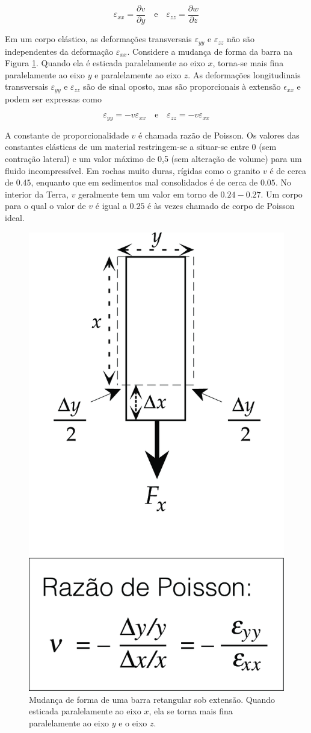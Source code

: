 \documentclass[]{book}
\theoremstyle{definition}
\theoremstyle{definition}
\theoremstyle{definition}
\theoremstyle{remark}
\begin{document}
\begin{equation}
\varepsilon_{xx}= \frac{\partial{v}}{\partial y} \quad \text{e} \quad \varepsilon_{zz}= \frac{\partial{w}}{\partial z}  \label{eq:0305}
\end{equation}

Em um corpo elástico, as deformações transversais \(\varepsilon_{yy}\) e \(\varepsilon_{zz}\) não são independentes da deformação \(\varepsilon_{xx}\). Considere a mudança de forma da barra na Figura \ref{fig:poisson}. Quando ela é esticada paralelamente ao eixo \(x\), torna-se mais fina paralelamente ao eixo \(y\) e paralelamente ao eixo \(z\). As deformações longitudinais transversais \(\varepsilon_{yy}\) e \(\varepsilon_{zz}\) são de sinal oposto, mas são proporcionais à extensão \(\epsilon_{xx}\) e podem ser expressas como

\begin{equation}
\varepsilon_{yy} = - v \varepsilon_{xx} \quad \text{e} \quad \varepsilon_{zz} = - v \varepsilon_{xx} \label{eq:0306}
\end{equation}

A constante de proporcionalidade \(v\) é chamada razão de Poisson. Os valores das constantes elásticas de um material restringem-se a situar-se entre 0 (sem contração lateral) e um valor máximo de 0,5 (sem alteração de volume) para um fluido incompressível. Em rochas muito duras, rígidas como o granito \(v\) é de cerca de \(0.45\), enquanto que em sedimentos mal consolidados é de cerca de \(0.05\). No interior da Terra, \(v\) geralmente tem um valor em torno de \(0.24-0.27\). Um corpo para o qual o valor de \(v\) é igual a \(0.25\) é às vezes chamado de corpo de Poisson ideal.

\begin{figure}

{\centering \includegraphics[width=0.4\linewidth]{fig/Fig_03.05} 

}

\caption{Mudança de forma de uma barra retangular sob extensão. Quando esticada paralelamente ao eixo $x$, ela se torna mais fina paralelamente ao eixo $y$ e o eixo $z$.}\label{fig:poisson}
\end{figure}
\end{document}
